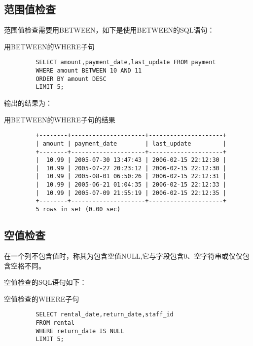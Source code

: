 \documentclass[UTF8]{article}
\begin{document}
\subsection{范围值检查}

范围值检查需要用BETWEEN，如下是使用BETWEEN的SQL语句：
\begin{listing}[H]
	\caption{用BETWEEN的WHERE子句}
	\label{code:betweenwhereclause}
	\begin{verbatim}
         SELECT amount,payment_date,last_update FROM payment 
         WHERE amount BETWEEN 10 AND 11
         ORDER BY amount DESC 
         LIMIT 5;
        \end{verbatim}
\end{listing}

输出的结果为：

\begin{listing}[H]
	\caption{用BETWEEN的WHERE子句的结果}
	\label{code:betweenwhereclauseresult}
	\begin{verbatim}
         +--------+---------------------+---------------------+
         | amount | payment_date        | last_update         |
         +--------+---------------------+---------------------+
         |  10.99 | 2005-07-30 13:47:43 | 2006-02-15 22:12:30 |
         |  10.99 | 2005-07-27 20:23:12 | 2006-02-15 22:12:30 |
         |  10.99 | 2005-08-01 06:50:26 | 2006-02-15 22:12:31 |
         |  10.99 | 2005-06-21 01:04:35 | 2006-02-15 22:12:33 |
         |  10.99 | 2005-07-09 21:55:19 | 2006-02-15 22:12:35 |
         +--------+---------------------+---------------------+
         5 rows in set (0.00 sec)
        \end{verbatim}
\end{listing}

\subsection{空值检查}

\begin{redbox}[frametitle={Defination 6.5 NULL 无值（no value）}]
        在一个列不包含值时，称其为包含空值NULL,它与字段包含0、空字符串或仅仅包含空格不同。
\end{redbox}
空值检查的SQL语句如下：
\begin{listing}[H]
	\caption{空值检查的WHERE子句}
	\label{code:isnullnwhereclause}
	\begin{verbatim}
         SELECT rental_date,return_date,staff_id 
         FROM rental 
         WHERE return_date IS NULL 
         LIMIT 5;
        \end{verbatim}
\end{listing}
\end{document}
